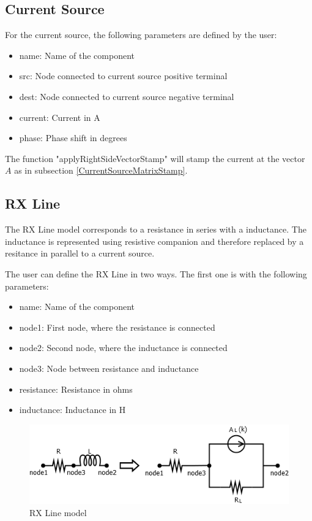 \subsection{Current Source}

For the current source, the following parameters are defined by the user:

\begin{itemize}
\item name: Name of the component
\item src: Node connected to current source positive terminal
\item dest: Node connected to current source negative terminal
\item current: Current in A
\item phase: Phase shift in degrees
\end{itemize}

The function "applyRightSideVectorStamp" will stamp the current at the vector $A$ as in subsection \ref{CurrentSourceMatrixStamp}.

\subsection{RX Line}
The RX Line model corresponds to a resistance in series with a inductance. The inductance is represented using resistive companion and therefore replaced by a resitance in parallel to a current source.

The user can define the RX Line in two ways. The first one is with the following parameters:

\begin{itemize}
\item name: Name of the component
\item node1: First node, where the resistance is connected
\item node2: Second node, where the inductance is connected
\item node3: Node between resistance and inductance 
\item resistance: Resistance in ohms
\item inductance: Inductance in H
\end{itemize}

\begin{figure}[h]
	\centering
	\includegraphics[scale=0.5]{img/RxLine.png} 
	\caption{RX Line model}
	\label{fig:RxLine}
\end{figure}

